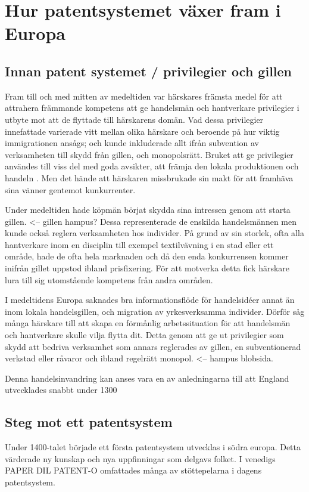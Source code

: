 \section{Hur patentsystemet växer fram i Europa}

\subsection{Innan patent systemet / privilegier och gillen} %
\label{sub:innan_patent_systemet}

Fram till och med mitten av medeltiden var härskares främsta medel för att
attrahera främmande kompetens att ge handelsmän och hantverkare privilegier i
utbyte mot att de flyttade till härskarens domän. 
Vad dessa privilegier innefattade varierade vitt mellan olika härskare och
beroende på hur viktig immigrationen ansågs; och kunde inkluderade allt ifrån
subvention av verksamheten till skydd från gillen, och monopolsrätt. 
Bruket att ge privilegier användes till viss del med goda avsikter, att främja
den lokala produktionen och handeln \cite{nard}. Men det hände att härskaren
missbrukade sin makt för att framhäva sina vänner gentemot kunkurrenter.

Under medeltiden hade köpmän börjat skydda sina intressen genom att starta
gillen. <-- gillen hampus?
Dessa representerade de enskilda handelsmännen men kunde också reglera
verksamheten hos individer.
På grund av sin storlek, ofta alla hantverkare inom en disciplin till exempel
textilvävning i en stad eller ett område, hade de ofta hela marknaden och då
den enda konkurrensen kommer inifrån gillet uppstod ibland prisfixering. 
För att motverka detta fick härskare lura till sig utomstående kompetens från
andra områden.

I medeltidens Europa saknades bra informationsflöde för handelsidéer annat än
inom lokala handelsgillen, och migration av yrkesverksamma individer. 
Dörför såg många härskare till att skapa en förmånlig arbetssituation för att
handelsmän och hantverkare skulle vilja flytta dit. 
Detta genom att ge ut privilegier som skydd att bedriva verksamhet som annars
reglerades av gillen, en subventionerad verkstad eller råvaror och ibland
regelrätt monopol. <-- hampus blobsida. 

Denna handelsinvandring kan anses vara en av anledningarna till att England
utvecklades snabbt under 1300


\subsection{Steg mot ett patentsystem} %
\label{sub:steg_mot_ett_patent_system}
Under 1400-talet började ett första patentsystem utvecklas i södra europa. 
Detta värderade ny kunskap och nya uppfinningar som delgavs folket. 
I venedigs PAPER DIL PATENT-O omfattades många av stöttepelarna i dagens patentsystem. 


